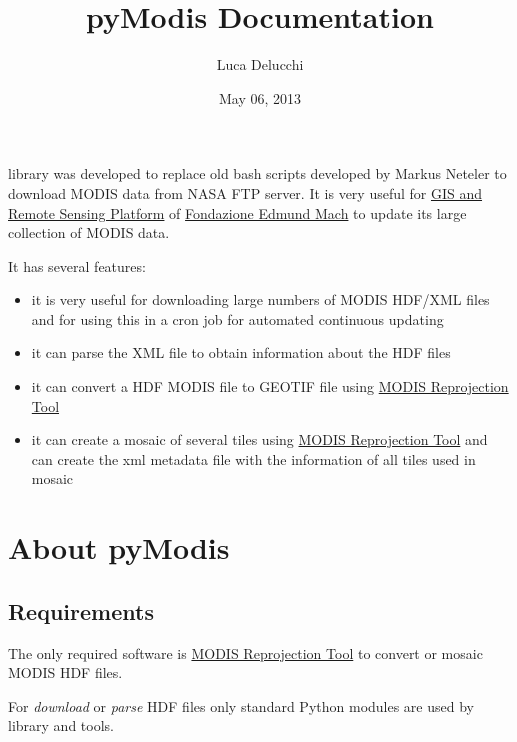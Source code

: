 \documentclass[a4paper,11pt,oneside]{sphinxmanual}
\title{pyModis Documentation}
\date{May 06, 2013}
\author{Luca Delucchi}
\begin{document}
\maketitle
\tableofcontents
{}\label{index::doc}


 library was developed to replace old bash scripts developed by Markus
Neteler to download MODIS data from NASA FTP server. It is very useful for
\href{http://gis.cri.fmach.it}{GIS and Remote Sensing Platform} of \href{http://www.fmach.it}{Fondazione Edmund Mach} to update
its large collection of MODIS data.

It has several features:
\begin{itemize}
\item {} 
it is very useful for downloading large numbers of MODIS HDF/XML files
and for using this in a cron job for automated continuous updating

\item {} 
it can parse the XML file to obtain information about the HDF files

\item {} 
it can convert a HDF MODIS file to GEOTIF file using \href{https://lpdaac.usgs.gov/lpdaac/tools/modis\_reprojection\_tool}{MODIS Reprojection Tool}

\item {} 
it can create a mosaic of several tiles using \href{https://lpdaac.usgs.gov/lpdaac/tools/modis\_reprojection\_tool}{MODIS Reprojection Tool} and can
create the xml metadata file with the information of all tiles used in mosaic

\end{itemize}


\chapter{About pyModis}
\label{info:welcome-to-pymodis}\label{info::doc}\label{info:about-pymodis}

\section{Requirements}
\label{info:requirements}
The only required software is \href{https://lpdaac.usgs.gov/tools/modis\_reprojection\_tool}{MODIS Reprojection Tool}
to convert or mosaic MODIS HDF files.

For \emph{download} or \emph{parse} HDF files only standard Python modules are used
by  library and tools.
\end{document}
